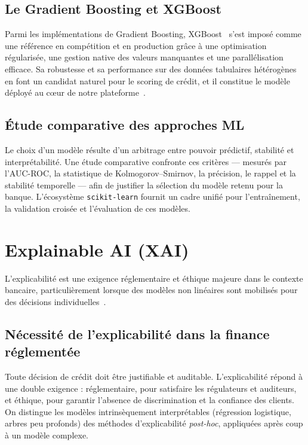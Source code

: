\documentclass[a4paper,12pt,oneside]{report}
\begin{document}
\subsection{Le Gradient Boosting et XGBoost}

Parmi les implémentations de Gradient Boosting, XGBoost~\cite{chen2016} s'est imposé comme une
référence en compétition et en production grâce à une optimisation régularisée, une gestion
native des valeurs manquantes et une parallélisation efficace. Sa robustesse et sa performance
sur des données tabulaires hétérogènes en font un candidat naturel pour le scoring de crédit,
et il constitue le modèle déployé au c\oe ur de notre plateforme~\cite{xgboostdoc}.

\subsection{Étude comparative des approches ML}

Le choix d'un modèle résulte d'un arbitrage entre pouvoir prédictif, stabilité et
interprétabilité. Une étude comparative confronte ces critères — mesurés par l'AUC-ROC, la
statistique de Kolmogorov--Smirnov, la précision, le rappel et la stabilité temporelle — afin
de justifier la sélection du modèle retenu pour la banque. L'écosystème \texttt{scikit-learn}
\cite{pedregosa2011} fournit un cadre unifié pour l'entraînement, la validation croisée et
l'évaluation de ces modèles.

\section{Explainable AI (XAI)}

L'explicabilité est une exigence réglementaire et éthique majeure dans le contexte bancaire,
particulièrement lorsque des modèles non linéaires sont mobilisés pour des décisions
individuelles~\cite{molnar2022}.

\subsection{Nécessité de l'explicabilité dans la finance réglementée}

Toute décision de crédit doit être justifiable et auditable. L'explicabilité répond à une
double exigence : réglementaire, pour satisfaire les régulateurs et auditeurs, et éthique,
pour garantir l'absence de discrimination et la confiance des clients. On distingue les
modèles intrinsèquement interprétables (régression logistique, arbres peu profonds) des
méthodes d'explicabilité \textit{post-hoc}, appliquées après coup à un modèle complexe.
\end{document}
